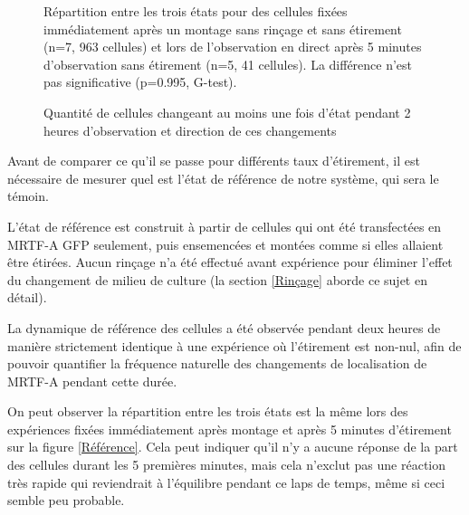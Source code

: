 \begin{figure}
\caption{Répartition entre les trois états pour des cellules fixées immédiatement après un montage sans rinçage et sans étirement (n=7, 963 cellules) et lors de l'observation en direct après 5 minutes d'observation sans étirement (n=5, 41 cellules). La différence n'est pas significative (p=0.995, G-test).
\label{Référence}}

\caption{Quantité de cellules changeant au moins une fois d'état pendant 2 heures d'observation et direction de ces changements \label{Ref_transloc}}
\end{figure}

Avant de comparer ce qu'il se passe pour différents taux d'étirement, il est nécessaire de mesurer quel est l'état de référence de notre système, qui sera le témoin. 

L'état de référence est construit à partir de cellules qui ont été transfectées en MRTF-A GFP seulement, puis ensemencées et montées comme si elles allaient être étirées. 
Aucun rinçage n'a été effectué avant expérience pour éliminer l'effet du changement de milieu de culture (la section \ref{Rinçage} aborde ce sujet en détail). 

La dynamique de référence des cellules a été observée pendant deux heures de manière strictement identique à une expérience où l'étirement est non-nul, afin de pouvoir quantifier la fréquence naturelle des changements de localisation de MRTF-A pendant cette durée. 





On peut observer la répartition entre les trois états est la même lors des expériences fixées immédiatement après montage et après 5 minutes d'étirement sur la figure \ref{Référence}.
Cela peut indiquer qu'il n'y a aucune réponse de la part des cellules durant les 5 premières minutes, mais cela n'exclut pas une réaction très rapide qui reviendrait à l'équilibre pendant ce laps de temps, même si ceci semble peu probable. 

